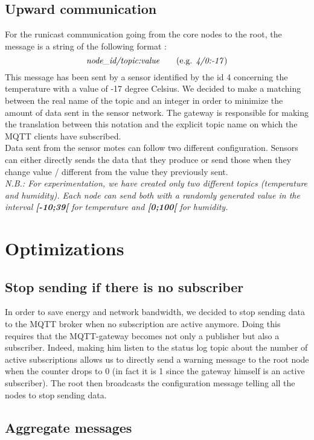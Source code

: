 \documentclass{article}
\begin{document}
\subsection{Upward communication}

For the runicast communication going from the core nodes to the root, the message is a string of the following format : \\
$$ \textit{node\_id/topic:value} \qquad \textrm{(e.g. \textit{4/0:-17})} $$
This message has been sent by a sensor identified by the id 4 concerning the temperature with a value of -17 degree Celsius. We decided to make a matching between the real name of the topic and an integer in order to minimize the amount of data sent in the sensor network. The gateway is responsible for making the translation between this notation and the explicit topic name on which the MQTT clients have subscribed. \\
Data sent from the sensor motes can follow two different configuration. Sensors can either directly sends the data that they produce or send those when they change value / different from the value they previously sent.
\\
\textit{N.B.: For experimentation, we have created only two different topics (temperature and humidity). Each node can send both with a randomly generated value in the interval \textbf{[-10;39[} for temperature and \textbf{[0;100[} for humidity.}

\section{Optimizations}

\subsection{Stop sending if there is no subscriber}

In order to save energy and network bandwidth, we decided to stop sending data to the MQTT broker when no subscription are active anymore. Doing this requires that the MQTT-gateway becomes not only a publisher but also a subscriber. Indeed, making him listen to the status log topic about the number of active subscriptions allows us to directly send a warning message to the root node when the counter drops to 0 (in fact it is 1 since the gateway himself is an active subscriber). The root then broadcasts the configuration message telling all the nodes to stop sending data.

\subsection{Aggregate messages}
\end{document}
